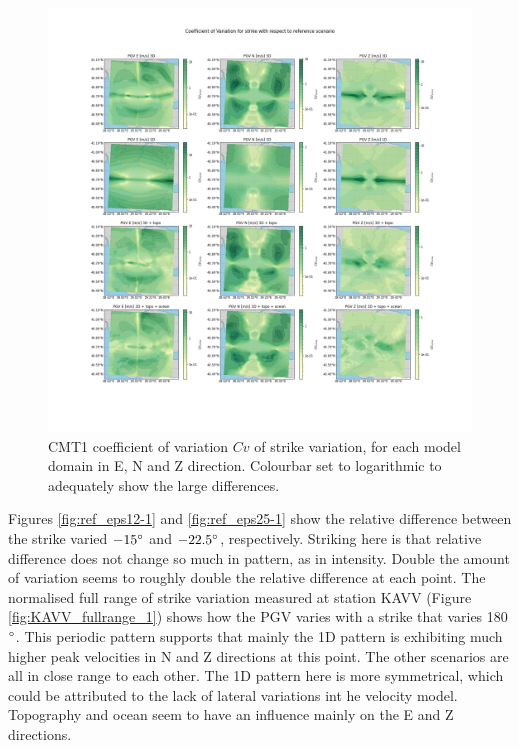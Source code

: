\documentclass[../Text/00main.tex]{subfiles}
\begin{document}
\begin{figure}[htb]
    \centering
    \includegraphics[width=1.2\linewidth]{images_results/strike_variation_sigma_sc1.png}
    \caption{CMT1 coefficient of variation $Cv$ of strike variation, for each model domain in E, N and Z direction. Colourbar set to logarithmic to adequately show the large differences.}
    \label{fig:ref_sigma1_strike}
\end{figure}



Figures \ref{fig:ref_eps12-1} and \ref{fig:ref_eps25-1} show the relative difference between the strike varied $- 15\degree$ and $- 22.5\degree$, respectively. Striking here is that relative difference does not change so much in pattern, as in intensity. Double the amount of variation seems to roughly double the relative difference at each point. The normalised full range of strike variation measured at station KAVV (Figure \ref{fig:KAVV_fullrange_1}) shows how the PGV varies with a strike that varies 180$\degree$. This periodic pattern supports that mainly the 1D pattern is exhibiting much higher peak velocities in N and Z directions at this point. The other scenarios are all in close range to each other. The 1D pattern here is more symmetrical, which could be attributed to the lack of lateral variations int he velocity model. Topography and ocean seem to have an influence mainly on the E and Z directions. 
\end{document}
